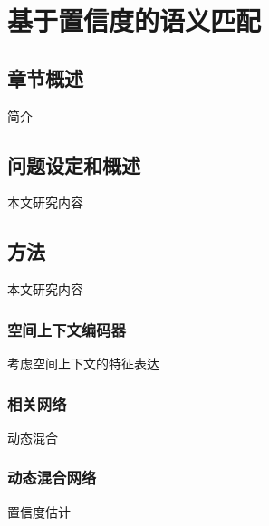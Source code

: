 \chapter{基于置信度的语义匹配}

\section{章节概述}
简介
\section{问题设定和概述}
本文研究内容
\section{方法}
本文研究内容
\subsection{空间上下文编码器}
考虑空间上下文的特征表达
\subsection{相关网络}
动态混合
\subsection{动态混合网络}
置信度估计

